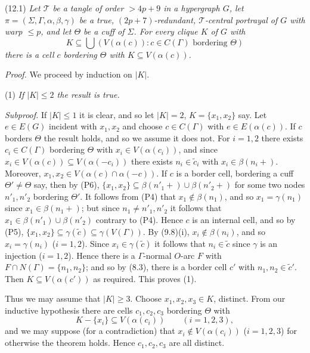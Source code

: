 \stmt
(12.1) \textit{Let $\mathscr{T}$ be a tangle of order $> 4p+9$ in a hypergraph $G$, let $\pi = (\Sigma, \Gamma, \alpha, \beta, \gamma)$ be a true, $(2p+7)$-redundant, $\mathscr{T}$-central portrayal of $G$ with warp $\le p$, and let $\Theta$ be a cuff of $\Sigma$. For every clique $K$ of $G$ with}
\begin{equation*}
K \subseteq \bigcup (V(\alpha(c)) \colon c \in C(\Gamma) \text{ bordering } \Theta)
\end{equation*}
\textit{there is a cell $c$ bordering $\Theta$ with $K \subseteq V(\alpha(c))$.}

\textit{Proof.} We proceed by induction on $|K|$.

\hspace*{12pt}(1) \textit{If $|K| \le 2$ the result is true.}

\textit{Subproof.} If $|K| \le 1$ it is clear, and so let $|K| = 2$, $K = \{x_1, x_2\}$ say. Let $e \in E(G)$ incident with $x_1, x_2$ and choose $c \in C(\Gamma)$ with $e \in E(\alpha(c))$. If $c$ borders $\Theta$ the result holds, and so we assume it does not. For $i = 1, 2$ there exists $c_i \in C(\Gamma)$ bordering $\Theta$ with $x_i \in V(\alpha(c_i))$, and since $x_i \in V(\alpha(c)) \subseteq V(\alpha(-c_i))$ there exists $n_i \in \tilde{c}_i$ with $x_i \in \beta(n_i+)$. Moreover, $x_1, x_2 \in V(\alpha(c) \cap \alpha(-c))$. If $c$ is a border cell, bordering a cuff $\Theta' \ne \Theta$ say, then by (P6), $\{x_1, x_2\} \subseteq \beta(n'_1+) \cup \beta(n'_2+)$ for some two nodes $n'_1, n'_2$ bordering $\Theta'$. It follows from (P4) that $x_1 \notin \beta(n_1)$, and so $x_1 = \gamma(n_1)$ since $x_1 \in \beta(n_1+)$; but since $n_1 \ne n'_1, n'_2$ it follows that $x_1 \in \beta(n'_1) \cup \beta(n'_2)$ contrary to (P4). Hence $c$ is an internal cell, and so by (P5), $\{x_1, x_2\} \subseteq \gamma(\tilde{c}) \subseteq \gamma(V(\Gamma))$. By (9.8)(i), $x_i \notin \beta(n_i)$, and so $x_i = \gamma(n_i)$ ($i = 1, 2$). Since $x_i \in \gamma(\tilde{c})$ it follows that $n_i \in \tilde{c}$ since $\gamma$ is an injection ($i = 1, 2$). Hence there is a $\Gamma$-normal $O$-arc $F$ with $F \cap N(\Gamma) = \{n_1, n_2\}$; and so by (8.3), there is a border cell $c'$ with $n_1, n_2 \in \tilde{c}'$. Then $K \subseteq V(\alpha(c'))$ as required. This proves (1).

Thus we may assume that $|K| \ge 3$. Choose $x_1, x_2, x_3 \in K$, distinct. From our inductive hypothesis there are cells $c_1, c_2, c_3$ bordering $\Theta$ with
\begin{equation*}
K - \{x_i\} \subseteq V(\alpha(c_i)) \qquad (i = 1, 2, 3),
\end{equation*}
and we may suppose (for a contradiction) that $x_i \notin V(\alpha(c_i))$ ($i = 1, 2, 3$) for otherwise the theorem holds. Hence $c_1, c_2, c_3$ are all distinct.

